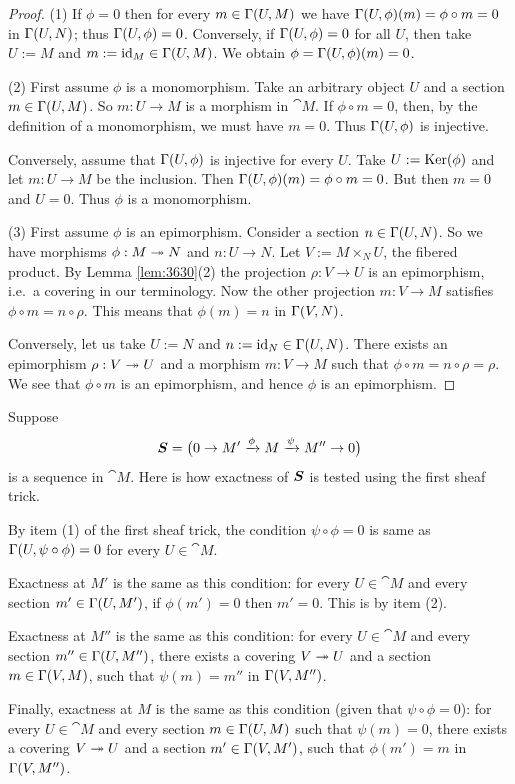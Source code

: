 \begin{proof}
(1) If $\phi = 0$ then for every $m \in \Gamma(U, M)$ 
we have $\Gamma(U, \phi)(m) = \phi \circ m = 0$ in $\Gamma(U, N)$; thus 
$\Gamma(U, \phi) = 0$. 
Conversely, if $\Gamma(U, \phi) = 0$ for all $U$, then take $U := M$ and 
$m := \operatorname{id}_M \in \Gamma(U, M)$. We obtain 
$\phi = \Gamma(U, \phi)(m) = 0$. 

\medskip \noindent
(2) First assume $\phi$ is a monomorphism. Take an arbitrary object $U$ and 
a section $m \in \Gamma(U, M)$. So $m : U \to M$ is a morphism in $\cat{M}$. 
 If $\phi \circ m = 0$, then, by the definition of a monomorphism, we must have 
$m = 0$. Thus $\Gamma(U, \phi)$ is injective.

Conversely, assume that $\Gamma(U, \phi)$ is injective for every $U$.
Take $U := \operatorname{Ker}(\phi)$ and let
$m : U \to M$ be the inclusion. Then 
$\Gamma(U, \phi)(m) = \phi \circ m = 0$.
But then $m = 0$ and $U = 0$. Thus $\phi$ is a monomorphism. 

\medskip \noindent
(3) First assume $\phi$ is an epimorphism. Consider a section 
$n \in \Gamma(U, N)$. So we have morphisms 
$\phi : M \twoheadrightarrow N$ and $n : U \to N$. Let
$V := M \times_N U$, the fibered product. By Lemma \ref{lem:3630}(2)
the projection $\rho : V \to U$ is an epimorphism, i.e.\ a covering in our 
terminology. Now the other projection
$m : V \to M$ satisfies $\phi \circ m = n \circ \rho$. 
This means that $\phi(m) = n$ in $\Gamma(V, N)$.   

Conversely, let us take $U := N$ and 
$n := \operatorname{id}_N \in \Gamma(U, N)$. There exists an epimorphism 
$\rho : V \twoheadrightarrow U$ and a morphism $m : V \to M$ such that 
$\phi \circ m = n \circ \rho = \rho$.
We see that $\phi \circ m$ is an epimorphism, and hence $\phi$ is an 
epimorphism.
\end{proof}

\begin{exa} \label{exa:4090}
Suppose 
\[ \boldsymbol{S} = \bigl(  0 \to M' \xrightarrow{\phi} M \xrightarrow{\psi} M'' \to 0 \bigr) \]
is a sequence in $\cat{M}$. Here is how exactness of $\boldsymbol{S}$ is tested using 
the first sheaf trick. 

By item (1) of the first sheaf trick, 
the condition $\psi \circ \phi = 0$ is same as 
$\Gamma(U, \psi \circ \phi) = 0$ for every $U \in \cat{M}$. 

Exactness at $M'$ is the same as this condition: for every $U \in \cat{M}$ and 
every section $m' \in \Gamma(U, M')$, if $\phi(m') = 0$ then $m' = 0$. 
This is by item (2). 

Exactness at $M''$ is the same as this condition: 
for every $U \in \cat{M}$ and every section 
$m'' \in \Gamma(U, M'')$, there exists a covering $V \twoheadrightarrow U$ and a section 
$m \in \Gamma(V, M)$, such that 
$\psi(m) = m''$ in $\Gamma(V, M'')$.

Finally, exactness at $M$ is the same as this condition (given that 
$\psi \circ \phi = 0$): for every $U \in \cat{M}$ and every section 
$m \in \Gamma(U, M)$ such that $\psi(m) = 0$, there exists a covering 
$V \twoheadrightarrow U$ and a section $m' \in \Gamma(V, M')$, such that 
$\phi(m') = m$ in $\Gamma(V, M'')$.
\end{exa}

